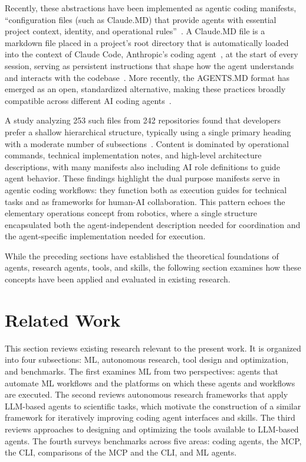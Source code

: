 \documentclass[
english,                 %
bibtex,                  %
includeExtraAbstracts, %
]{kththesis}
\numberwithin{listing}{chapter}
\begin{document}
Recently, these abstractions have been implemented as agentic coding manifests, ``configuration files (such as Claude.\gls{MD}) that provide agents with essential project context, identity, and operational rules''~\cite{scanniello_use_2026}. A Claude.\gls{MD} file is a markdown file placed in a project's root directory that is automatically loaded into the context of Claude Code, Anthropic's coding agent~\cite{anthropic_pbc_claude_2026}, at the start of every session, serving as persistent instructions that shape how the agent understands and interacts with the codebase~\cite{anthropic_pbc_how_2026}. More recently, the AGENTS.\gls{MD} format has emerged as an open, standardized alternative, making these practices broadly compatible across different \gls{AI} coding agents~\cite{lf_projects_llc_agentsmd_2026}.

A study analyzing 253 such files from 242 repositories found that developers prefer a shallow hierarchical structure, typically using a single primary heading with a moderate number of subsections~\cite{scanniello_use_2026}. Content is dominated by operational commands, technical implementation notes, and high-level architecture descriptions, with many manifests also including \gls{AI} role definitions to guide agent behavior. These findings highlight the dual purpose manifests serve in agentic coding workflows: they function both as execution guides for technical tasks and as frameworks for human-\gls{AI} collaboration. This pattern echoes the elementary operations concept from robotics, where a single structure encapsulated both the agent-independent description needed for coordination and the agent-specific implementation needed for execution.

While the preceding sections have established the theoretical foundations of agents, research agents, tools, and skills, the following section examines how these concepts have been applied and evaluated in existing research.

\section{Related Work}
\glsresetall

This section reviews existing research relevant to the present work. It is organized into four subsections: \gls{ML}, autonomous research, tool design and optimization, and benchmarks. The first examines \gls{ML} from two perspectives: agents that automate \gls{ML} workflows and the platforms on which these agents and workflows are executed. The second reviews autonomous research frameworks that apply \gls{LLM}-based agents to scientific tasks, which motivate the construction of a similar framework for iteratively improving coding agent interfaces and skills. The third reviews approaches to designing and optimizing the tools available to \gls{LLM}-based agents. The fourth surveys benchmarks across five areas: coding agents, the \gls{MCP}, the \gls{CLI}, comparisons of the \gls{MCP} and the \gls{CLI}, and \gls{ML} agents.
\end{document}
